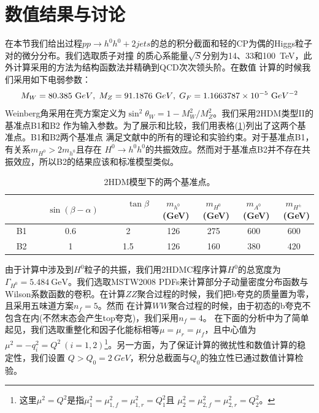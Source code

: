 \section{数值结果与讨论}
在本节我们给出过程$pp\to h^0h^0+2jets$的总的积分截面和轻的CP为偶的Higgs粒子对的微分分布。我们选取质子对撞
的质心系能量$\sqrt{S}$分别为14、33和100~TeV，此外计算采用的方法为结构函数法并精确到QCD次次领头阶。在数值
计算的时候我们采用如下电弱参数：
\begin{eqnarray}
M_W = 80.385~ {\textrm GeV},\;
M_Z = 91.1876~ {\textrm GeV},\;
G_F = 1.1663787 \times 10^{-5}~ {\textrm GeV}^{-2}
\end{eqnarray}
Weinberg角采用在壳方案定义为$\sin^2\theta_W = 1 - M_W^2/M_Z^2$。我们采用2HDM类型II的基准点B1和B2
作为输入参数。为了展示和比较，我们用表格(\ref{tab:benchmark})列出了这两个基准点。B1和B2两个基准点
满足文献\cite{sushufang:2hdm}中的所有的理论和实验约束。对于基准点B1，有关系$m_{H^0} > 2m_{h^0}$且存在
$H^0\to h^0h^0$的共振效应。然而对于基准点B2并不存在共振效应，所以B2的结果应该和标准模型类似。

\begin{table}
  \centering
  \begin{tabular}{|c|c|c|c|c|c|c|}
    \hline\hline
     ~~~~~ & ~$\sin(\beta-\alpha)$ & ~~~~$\tan\beta$~~~~ & $m_{h^0}$~(GeV) & $m_{H^0}$~(GeV)
     & $m_{A^0}$~(GeV) & $m_{H^{\pm}}$~(GeV) \\
    \hline
    B1 & 0.6 & 2 & 126 & 275 & 600 & 600 \\
    B2 & 1 & 1.5 & 126 & 160 & 380 & 420 \\
    \hline\hline
  \end{tabular}
\caption{2HDM模型下的两个基准点。} 
\label{tab:benchmark}
\end{table}

由于计算中涉及到$H^0$粒子的共振，我们用2HDMC程序\cite{cpc:2hdmc}计算$H^0$的总宽度为
$\Gamma_{H^0} = 5.484~\textrm{GeV}$。我们选取MSTW2008 PDFs\cite{mstw2008}来计算部分子动量密度分布函数与
Wilson系数函数的卷积。在计算$ZZ$聚合过程的时候，我们把b夸克的质量置为零，且采用五味道方案$n_f = 5$。然而
在计算$WW$聚合过程的时候，由于初态的b夸克不包含在内(不然末态会产生top夸克)，我们采用$n_f = 4$。
在下面的分析中为了简单起见，我们选取重整化和因子化能标相等$\mu = \mu_r = \mu_f$，且中心值为
$\mu^2=-q_i^2=Q^2~(i=1,2)$\footnote{这里$\mu^2=Q^2$是指$\mu_1^2=\mu_{1,f}^2=\mu_{1,r}^2=Q_1^2$且
$\mu_2^2=\mu_{2,f}^2=\mu_{2,r}^2=Q_2^2$。}。另一方面，为了保证计算的微扰性和数值计算的稳定性，我们设置
$Q > Q_0 = 2~GeV$，积分总截面与$Q_0$的独立性已通过数值计算检验。

